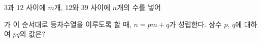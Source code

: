 $3$과 $12$ 사이에 $m$개, $12$와 $39$ 사이에 $n$개의 수를 넣어\par\smallskip{}\par\smallskip\noindent 가 이 순서대로 등차수열을 이루도록 할 때, $n=pm+q$가 성립한다. 상수 $p$, $q$에 대하여 $pq$의 값은?
